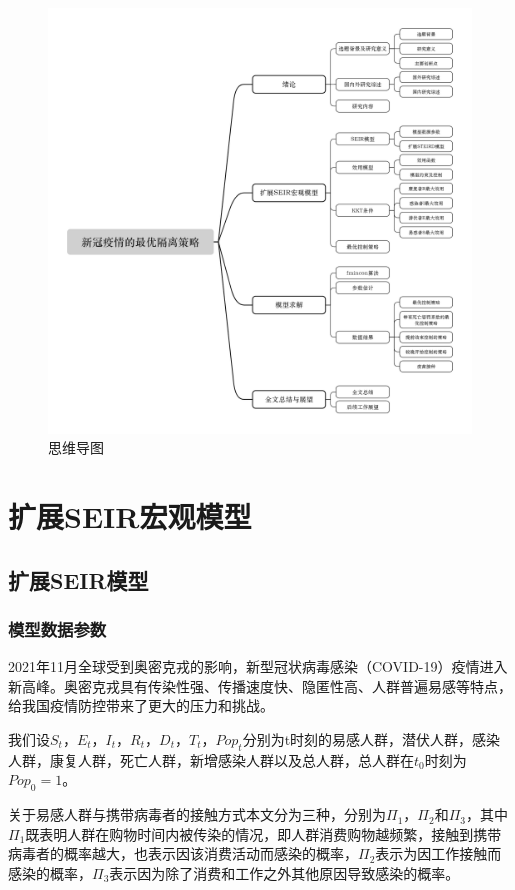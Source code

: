 \begin{figure}[htbp]
    \centering
    \includegraphics[width=1\textwidth]{fig/image059.png}
    \caption{思维导图}
    \label{fig:ima30}
\end{figure}
\vspace{110pt}
\section{扩展SEIR宏观模型}
\subsection{扩展SEIR模型}
\subsubsection{模型数据参数}
2021年11月全球受到奥密克戎的影响，新型冠状病毒感染（COVID-19）疫情进入新高峰。奥密克戎具有传染性强、传播速度快、隐匿性高、人群普遍易感等特点，给我国疫情防控带来了更大的压力和挑战。 

我们设$S_t$，$E_t$，$I_t$，$R_t$，$D_t$，$T_t$，$Pop_t$分别为t时刻的易感人群，潜伏人群，感染人群，康复人群，死亡人群，新增感染人群以及总人群，总人群在$t_0$时刻为$Pop_0=1$。

关于易感人群与携带病毒者的接触方式本文分为三种，分别为$\Pi_1$，$\Pi_2$和$\Pi_3$\cite{fu2022optimal}，其中$\Pi_1$既表明人群在购物时间内被传染的情况，即人群消费购物越频繁，接触到携带病毒者的概率越大，也表示因该消费活动而感染的概率，$\Pi_2$表示为因工作接触而感染的概率，$\Pi_3$表示因为除了消费和工作之外其他原因导致感染的概率。

